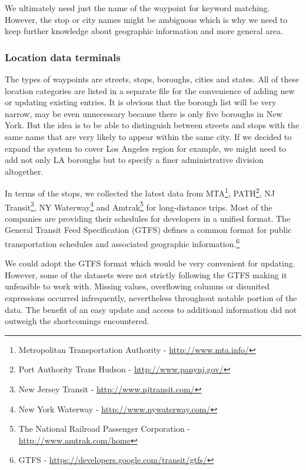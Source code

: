 We ultimately need just the name of the waypoint for keyword matching. 
However, the stop or city names might be ambiguous which is why we need to keep further knowledge about geographic information and more general area. %

\subsubsection{Location data terminals} \label{sec:terminals}

The types of waypoints are streets, stops, boroughs, cities and states.
All of these location categories are listed in a separate file for the convenience of adding new or updating existing entries.
It is obvious that the borough list will be very narrow, may be even unnecessary because there is only five boroughs in New York.
But the idea is to be able to distinguish between streets and stops with the same name that are very likely to appear within the same city.
If we decided to expand the system to cover Los Angeles region for example, we might need to add not only LA boroughs but to specify a finer administrative division altogether.

In terms of the stops, we collected the latest data from
MTA\footnote{Metropolitan Transportation Authority - \url{http://www.mta.info/}},
PATH\footnote{Port Authority Trans Hudson - \url{http://www.panynj.gov/}},
NJ Transit\footnote{New Jersey Transit - \url{http://www.njtransit.com/}},
NY Waterway\footnote{New York Waterway - \url{http://www.nywaterway.com/}} and
Amtrak\footnote{The National Railroad Passenger Corporation - \url{http://www.amtrak.com/home}} for long-distance trips.
Most of the companies are providing their schedules for developers in a unified format.
The General Transit Feed Specification (GTFS) defines a common format for public transportation schedules and associated geographic information.\footnote{GTFS - \url{https://developers.google.com/transit/gtfs/}}

We could adopt the GTFS format which would be very convenient for updating.
However, some of the datasets were not strictly following the GTFS making it unfeasible to work with.
Missing values, overflowing columns or disunited expressions occurred infrequently, nevertheless throughout notable portion of the data.
The benefit of an easy update and access to additional information did not outweigh the shortcomings encountered.

